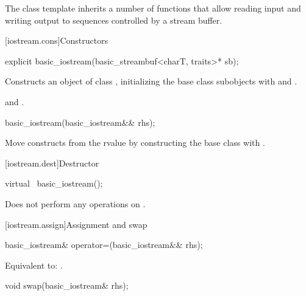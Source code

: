 \pnum
The class template
inherits a number of functions that allow reading input and writing output to
sequences controlled by a stream buffer.

[iostream.cons]{Constructors}

%
\begin{itemdecl}
explicit basic_iostream(basic_streambuf<charT, traits>* sb);
\end{itemdecl}

\begin{itemdescr}
\pnum
\effects
Constructs an object of class ,
initializing the base class subobjects with
and
.

\pnum
\ensures
{}
and
.
\end{itemdescr}

%
\begin{itemdecl}
basic_iostream(basic_iostream&& rhs);
\end{itemdecl}

\begin{itemdescr}
\pnum
\effects
Move constructs from the rvalue  by
constructing the  base class with
.
\end{itemdescr}

[iostream.dest]{Destructor}

%
\begin{itemdecl}
virtual ~basic_iostream();
\end{itemdecl}

\begin{itemdescr}
\pnum
\remarks
Does not perform any operations on
.
\end{itemdescr}

[iostream.assign]{Assignment and swap}

%
\begin{itemdecl}
basic_iostream& operator=(basic_iostream&& rhs);
\end{itemdecl}

\begin{itemdescr}
\pnum
\effects
Equivalent to: .
\end{itemdescr}

%
\begin{itemdecl}
void swap(basic_iostream& rhs);
\end{itemdecl}


